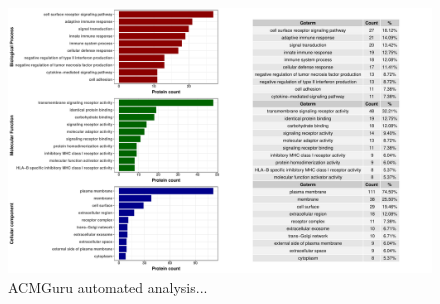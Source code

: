 \documentclass{article}
\begin{document}
\begin{figure}[h] \hspace*{0cm} 
\begin{center}
    \includegraphics[scale=0.35]{../images/acmguru/uniprotr_combined_go_plots}
    	\caption{ACMGuru automated analysis...}
	\label{fig:uniprotr_combined_go_plots}
\end{center}
\end{figure}
\end{document}
